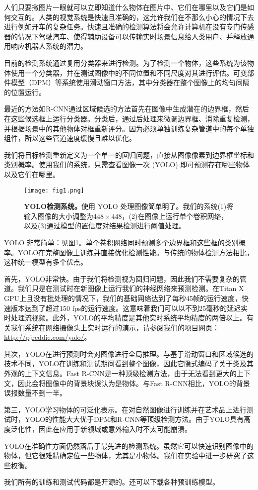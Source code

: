\documentclass[../main.tex]{subfile}
\begin{document}
人们只要撇图片一眼就可以立即知道什么物体在图片中、它们在哪里以及它们是如何交互的。人类的视觉系统是快速且准确的，这允许我们在不那么小心的情况下去进行例如开车的复杂任务。快速且准确的检测算法将会允许计算机在没有专门传感器的情况下驾驶汽车、使得辅助设备可以传输实时场景信息给人类用户、并释放通用响应机器人系统的潜力。

目前的检测系统通过复用分类器来进行检测。为了检测一个物体，这些系统为该物体使用一个分类器，并在测试图像中的不同位置和不同尺度对其进行评估。可变部件模型（DPM）等系统使用滑动窗口方法，其中分类器在整个图像上的均匀间隔的位置运行\cite{dpm}。

最近的方法如R-CNN通过区域候选的方法首先在图像中生成潜在的边界框，然后在这些候选框上运行分类器。分类后，通过后处理来微调边界框、消除重复检测，并根据场景中的其他物体对框重新评分\cite{rcnn}。因为必须单独训练复杂管道中的每个单独组件，所以这些管道速度缓慢且难以优化。

我们将目标检测重新定义为一个单一的回归问题，直接从图像像素到边界框坐标和类别概率。使用我们的系统，只需查看图像一次 (YOLO) 即可预测存在哪些物体以及它们在哪里。

\begin{figure}[htb]
    \centering
    \texttt{[image: fig1.png]}
    \caption{\textbf{YOLO检测系统。}使用 YOLO 处理图像简单明了。我们的系统(1)将输入图像的大小调整为$ 448 \times 448$，(2)在图像上运行单个卷积网络，以及(3)通过模型的置信度对结果检测进行阈值处理。}
    \label{fig:fig1}
\end{figure}

YOLO 非常简单：见图\ref{fig:fig1}。单个卷积网络同时预测多个边界框和这些框的类别概率。YOLO在完整图像上训练并直接优化检测性能。与传统的物体检测方法相比，这种统一模型有多个优点。

首先，YOLO非常快。由于我们将检测视为回归问题，因此我们不需要复杂的管道。我们只是在测试时在新图像上运行我们的神经网络来预测检测。在Titan X GPU上且没有批处理的情况下，我们的基础网络达到了每秒45帧的运行速度，快速版本达到了超过150 fps的运行速度。这意味着我们可以以不到25毫秒的延迟实时处理流视频。此外，YOLO的平均精度是其他实时系统平均精度的两倍以上。有关我们系统在网络摄像头上实时运行的演示，请参阅我们的项目网页：\href{http://pjreddie.com/yolo/}{http://pjreddie.com/yolo/}。

其次，YOLO在进行预测时会对图像进行全局推理。与基于滑动窗口和区域候选的技术不同，YOLO在训练和测试期间看到整个图像，因此它隐式编码了关于类及其外观的上下文信息。Fast R-CNN是一种顶级检测方法\cite{fastrcnn}，由于无法看到更大的上下文，因此会将图像中的背景块误认为是物体。与Fast R-CNN相比，YOLO的背景误报数量不到一半。

第三，YOLO学习物体的可泛化表示。在对自然图像进行训练并在艺术品上进行测试时，YOLO的性能大大优于DPM和R-CNN等顶级检测方法。由于YOLO具有高度泛化性，因此在应用于新领域或意外输入时不太可能崩溃。

YOLO在准确性方面仍然落后于最先进的检测系统。虽然它可以快速识别图像中的物体，但它很难精确定位一些物体，尤其是小物体。我们在实验中进一步研究了这些权衡。

我们所有的训练和测试代码都是开源的。还可以下载各种预训练模型。
\end{document}
